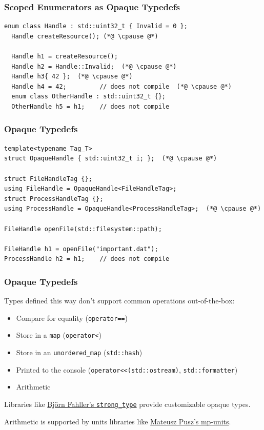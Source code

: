 \documentclass[aspectratio=169]{beamer}
\newif\iftransitions
\newcommand{\cpause}{\iftransitions \pause \fi}
\begin{document}
\begin{frame}[fragile]

  \frametitle{Scoped Enumerators as Opaque Typedefs}

  \begin{lstlisting}[style=cpp20]
  enum class Handle : std::uint32_t { Invalid = 0 };
  Handle createResource(); (*@ \cpause @*)
  
  Handle h1 = createResource();
  Handle h2 = Handle::Invalid;  (*@ \cpause @*)
  Handle h3{ 42 };  (*@ \cpause @*)
  Handle h4 = 42;         // does not compile  (*@ \cpause @*)
  enum class OtherHandle : std::uint32_t {};
  OtherHandle h5 = h1;    // does not compile
  \end{lstlisting}
  
\end{frame}


\begin{frame}[fragile]
  \frametitle{Opaque Typedefs}
  
  \begin{lstlisting}[style=cpp20]
template<typename Tag_T>
struct OpaqueHandle { std::uint32_t i; };  (*@ \cpause @*)

struct FileHandleTag {};
using FileHandle = OpaqueHandle<FileHandleTag>;
struct ProcessHandleTag {};
using ProcessHandle = OpaqueHandle<ProcessHandleTag>;  (*@ \cpause @*)

FileHandle openFile(std::filesystem::path);

FileHandle h1 = openFile("important.dat");
ProcessHandle h2 = h1;    // does not compile
  \end{lstlisting}
  
\end{frame}

\begin{frame}[fragile]
  \frametitle{Opaque Typedefs}
  
  Types defined this way don't support common operations out-of-the-box:
  \begin{itemize}
  \item Compare for equality (\texttt{operator==})
  \item Store in a \texttt{map} (\texttt{operator<})
  \item Store in an \texttt{unordered\_map} (\texttt{std::hash})
  \item Printed to the console (\texttt{operator<<(std::ostream)}, \texttt{std::formatter})
  \item Arithmetic
  \end{itemize}
  
  \cpause
  
  Libraries like \href{https://github.com/rollbear/strong_type}{Björn Fahller's \texttt{strong\_type}} provide customizable opaque types.
  
  Arithmetic is supported by units libraries like \href{https://github.com/mpusz/units}{Mateusz Pusz's mp-units}.
\end{frame}
\end{document}
